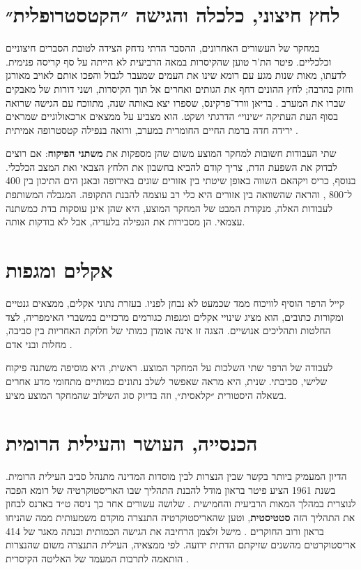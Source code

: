 \section{לחץ חיצוני, כלכלה והגישה ״הקטסטרופלית״}
\label{sec:lit-external}

במחקר של העשורים האחרונים, ההסבר הדתי נדחק הצידה לטובת הסברים חיצוניים וכלכליים. פיטר הת'ר טוען שהקיסרות במאה הרביעית לא הייתה על סף קריסה פנימית. לדעתו, מאות שנות מגע עם רומא שינו את העמים שמעבר לגבול והפכו אותם לאויב מאורגן וחזק בהרבה; לחץ ההונים דחף את הגותים ואחרים אל תוך הקיסרות, ושני דורות של מאבקים שברו את המערב \cite{heather2005fall}. בריאן וורד־פרקינס, שספרו יצא באותה שנה, מתווכח עם הגישה שרואה בסוף העת העתיקה ״שינוי״ הדרגתי ושקט. הוא מצביע על ממצאים ארכאולוגיים שמראים ירידה חדה ברמת החיים החומרית במערב, ורואה בנפילה קטסטרופה אמיתית \cite{wardperkins2005fall}.

שתי העבודות חשובות למחקר המוצע משום שהן מספקות את \textbf{משתני הפיקוח}: אם רוצים לבדוק את השפעת הדת, צריך קודם להביא בחשבון את הלחץ הצבאי ואת המצב הכלכלי. בנוסף, כריס ויקהאם השווה באופן שיטתי בין אזורים שונים באירופה ובאגן הים התיכון בין 400 ל־800 \cite{wickham2005framing}, והראה שהשוואה בין אזורים היא כלי רב עוצמה להבנת התקופה. המגבלה המשותפת לעבודות האלה, מנקודת המבט של המחקר המוצע, היא שהן אינן עוסקות בדת כמשתנה עצמאי. הן מסבירות את הנפילה בלעדיה, אבל לא בודקות אותה.

\section{אקלים ומגפות}
\label{sec:lit-climate}

קייל הרפר הוסיף לוויכוח ממד שכמעט לא נבחן לפניו. בעזרת נתוני אקלים, ממצאים גנטיים ומקורות כתובים, הוא מציג שינויי אקלים ומגפות כגורמים מרכזיים במשברי האימפריה, לצד החלטות ותהליכים אנושיים. הצגה זו אינה אומדן כמותי של חלוקת האחריות בין סביבה, מחלות ובני אדם \cite{harper2017fate}.

לעבודה של הרפר שתי השלכות על המחקר המוצע. ראשית, היא מוסיפה משתנה פיקוח שלישי, סביבתי. שנית, היא מראה שאפשר לשלב נתונים כמותיים מתחומי מדע אחרים בשאלה היסטורית ״קלאסית״, וזה בדיוק סוג השילוב שהמחקר המוצע מציע.

\section{הכנסייה, העושר והעילית הרומית}
\label{sec:lit-wealth}

הדיון המעמיק ביותר בקשר שבין הנצרות לבין מוסדות המדינה מתנהל סביב העילית הרומית. בשנת 1961 הציע פיטר בראון מודל להבנת התהליך שבו האריסטוקרטיה של רומא הפכה לנוצרית במהלך המאות הרביעית והחמישית \cite{brown1961aspects}. שלושה עשורים אחר כך ניסה ט״ד בארנס לבחון את התהליך הזה \textbf{סטטיסטית}, וטען שהאריסטוקרטיה התנצרה מוקדם משמעותית ממה שהניחו בראון ורוב החוקרים \cite{barnes1995statistics}. מישל זלצמן הרחיבה את הגישה הכמותית ובנתה מאגר של 414 אריסטוקרטים מהשנים  שזיקתם הדתית ידועה. לפי ממצאיה, העילית התנצרה משום שהנצרות הותאמה לתרבות המעמד של האליטה הקיסרית \cite{salzman2002making}.


